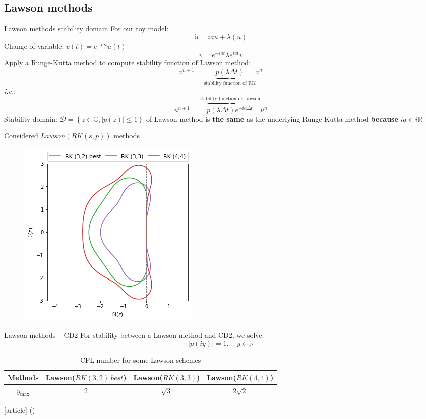 \documentclass{beamer}
\newcommand{\customcite}[1]{\citeauthor{#1} (\citeyear{#1})}
\begin{document}
\subsection{Lawson methods}
\begin{frame}{Lawson methods stability domain}
  For our toy model:
  $$
    \dot{u} = iau + \lambda(u)
  $$
  Change of variable: $v(t) = e^{-iat}u(t)$
  $$
    \dot{v} = e^{-iat}\lambda e^{iat}v
  $$
  Apply a Runge-Kutta method to compute stability function of Lawson method:
  $$
    v^{n+1} = \underbrace{p(\lambda\Delta t)}_{\text{stability function of RK}}v^n
  $$
  \emph{i.e.}:
  $$
    u^{n+1} = \overbrace{p(\lambda\Delta t)e^{-ia\Delta t}}^{\text{stability function of Lawson}}u^n
  $$
  Stability domain: $\mathcal{D}=\left\{z\in\mathbb{C},|p(z)|\leq 1\right\}$ of Lawson method is \textbf{the same} as the underlying Runge-Kutta method \textbf{because} $ia\in i\mathbb{R}$
\end{frame}
\begin{frame}{Considered $Lawson(RK(s,p))$ methods}
  \begin{figure}\centering
    \includegraphics[height=0.8\textheight]{img/rk_sd.png}
  \end{figure}
\end{frame}
\begin{frame}{Lawson methods -- CD2}
  For stability between a Lawson method and CD2, we solve:
  $$
    |p(iy)| = 1,\quad y\in\mathbb{R}
  $$
  \begin{table}
    \centering
    \begin{tabular}{|c|c|c|c|}
      \hline
      Methods & Lawson($RK(3,2) \; best$) & Lawson($RK(3,3)$) & Lawson($RK(4,4)$) \\
      \hline
      $y_{\max}$ & $2$ & $\sqrt{3}$ & $2\sqrt{2}$\\
      \hline  
    \end{tabular}
    \caption{CFL number for some Lawson schemes}
  \end{table}
\begin{thebibliography}{9}
  [article]
  \bibitem{} \customcite{Baldauf:2008}
\end{thebibliography}
\end{frame}
\end{document}
